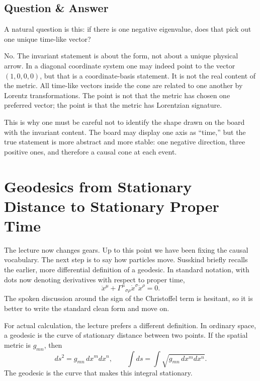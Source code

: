 \subsection{Question \& Answer}

A natural question is this: if there is one negative eigenvalue, does that pick out one unique time-like vector?

No. The invariant statement is about the form, not about a unique physical arrow. In a diagonal coordinate system one may indeed point to the vector \((1,0,0,0)\), but that is a coordinate-basis statement. It is not the real content of the metric. All time-like vectors inside the cone are related to one another by Lorentz transformations. The point is not that the metric has chosen one preferred vector; the point is that the metric has Lorentzian signature.

This is why one must be careful not to identify the shape drawn on the board with the invariant content. The board may display one axis as ``time,'' but the true statement is more abstract and more stable: one negative direction, three positive ones, and therefore a causal cone at each event.

\section{Geodesics from Stationary Distance to Stationary Proper Time}

The lecture now changes gears. Up to this point we have been fixing the causal vocabulary. The next step is to say how particles move. Susskind briefly recalls the earlier, more differential definition of a geodesic. In standard notation, with dots now denoting derivatives with respect to proper time,
\begin{equation}
\ddot x^\mu + \Gamma^\mu{}_{\sigma\rho}\dot x^\sigma\dot x^\rho = 0.
\end{equation}
The spoken discussion around the sign of the Christoffel term is hesitant, so it is better to write the standard clean form and move on.

For actual calculation, the lecture prefers a different definition. In ordinary space, a geodesic is the curve of stationary distance between two points. If the spatial metric is \(g_{mn}\), then
\begin{equation}
ds^2 = g_{mn}\,dx^m dx^n,
\qquad
\int ds = \int \sqrt{g_{mn}\,dx^m dx^n}.
\end{equation}
The geodesic is the curve that makes this integral stationary.

